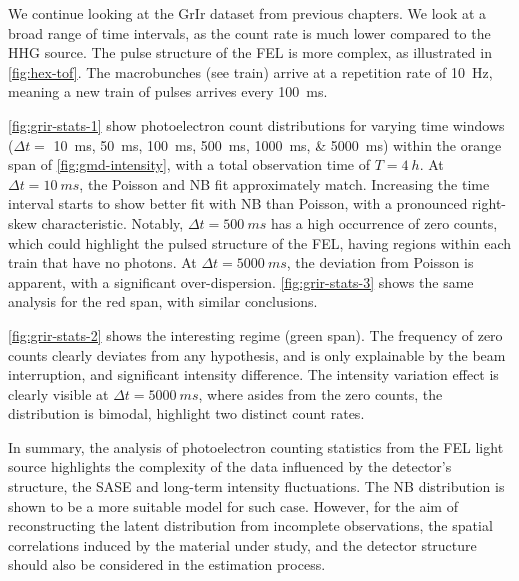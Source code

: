 We continue looking at the \gls{GrIr} dataset from previous chapters. We look at a broad range of time intervals, as the count rate is much lower compared to the \gls{HHG} source. The pulse structure of the \gls{FEL} is more complex, as illustrated in \cref{fig:hex-tof}. The macrobunches (see \gls{train}) arrive at a repetition rate of \qty{10}{Hz}, meaning a new train of \glspl{pulse} arrives every \qty{100}{ms}.


\cref{fig:grir-stats-1} show photoelectron count distributions for varying time windows ($\Delta t =$ \qtylist{10;50;100;500;1000;5000}{ms}) within the orange span of \cref{fig:gmd-intensity}, with a total observation time of $T=\qty{4}{h}$. At $\Delta t = \qty{10}{ms}$, the Poisson and \gls{NB} fit approximately match. Increasing the time interval starts to show better fit with \gls{NB} than Poisson, with a pronounced right-skew characteristic. Notably, $\Delta t = \qty{500}{ms}$ has a high occurrence of zero counts, which could highlight the pulsed structure of the \gls{FEL}, having regions within each train that have no photons. At $\Delta t = \qty{5000}{ms}$, the deviation from Poisson is apparent, with a significant over-dispersion. \cref{fig:grir-stats-3} shows the same analysis for the red span, with similar conclusions.

\cref{fig:grir-stats-2} shows the interesting regime (green span). The frequency of zero counts clearly deviates from any hypothesis, and is only explainable by the beam interruption, and significant intensity difference. The intensity variation effect is clearly visible at $\Delta t = \qty{5000}{ms}$, where asides from the zero counts, the distribution is bimodal, highlight two distinct count rates.

In summary, the analysis of photoelectron counting statistics from the \gls{FEL} light source highlights the complexity of the data influenced by the detector’s structure, the \gls{SASE} and long-term intensity fluctuations. The \gls{NB} distribution is shown to be a more suitable model for such case. However, for the aim of reconstructing the latent distribution from incomplete observations, the spatial correlations induced by the material under study, and the detector structure should also be considered in the estimation process.


